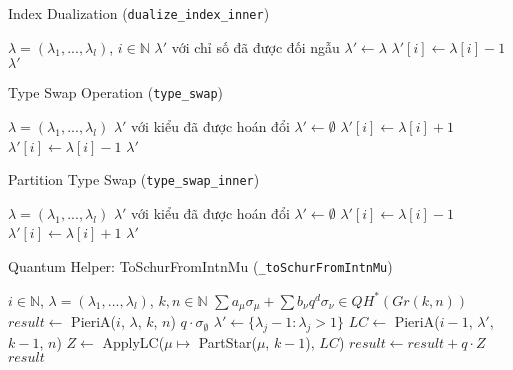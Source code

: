 \begin{algorithm}[H]
\caption{Index Dualization (\texttt{dualize\_index\_inner})}
\begin{algorithmic}[1]
\REQUIRE $\lambda = (\lambda_1, ..., \lambda_l)$, $i \in \mathbb{N}$
\ENSURE $\lambda'$ với chỉ số đã được đối ngẫu
\STATE $\lambda' \gets \lambda$
\STATE $\lambda'[i] \gets \lambda[i] - 1$
\RETURN $\lambda'$
\end{algorithmic}
\end{algorithm}

\begin{algorithm}[H]
\caption{Type Swap Operation (\texttt{type\_swap})}
\begin{algorithmic}[1]
\REQUIRE $\lambda = (\lambda_1, ..., \lambda_l)$
\ENSURE $\lambda'$ với kiểu đã được hoán đổi
\STATE $\lambda' \gets \emptyset$
        \STATE $\lambda'[i] \gets \lambda[i] + 1$
    \ELSE
        \STATE $\lambda'[i] \gets \lambda[i] - 1$
    \ENDIF
\ENDFOR
\RETURN $\lambda'$
\end{algorithmic}
\end{algorithm}

\begin{algorithm}[H]
\caption{Partition Type Swap (\texttt{type\_swap\_inner})}
\begin{algorithmic}[1]
\REQUIRE $\lambda = (\lambda_1, ..., \lambda_l)$
\ENSURE $\lambda'$ với kiểu đã được hoán đổi
\STATE $\lambda' \gets \emptyset$
        \STATE $\lambda'[i] \gets \lambda[i] - 1$
    \ELSE
        \STATE $\lambda'[i] \gets \lambda[i] + 1$
    \ENDIF
\ENDFOR
\RETURN $\lambda'$
\end{algorithmic}
\end{algorithm}

\begin{algorithm}[H]
\caption{Quantum Helper: ToSchurFromIntnMu (\texttt{\_toSchurFromIntnMu})}
\begin{algorithmic}[1]
\REQUIRE $i \in \mathbb{N}$, $\lambda = (\lambda_1, ..., \lambda_l)$, $k, n \in \mathbb{N}$
\ENSURE $\sum a_\mu \sigma_\mu + \sum b_\nu q^d \sigma_\nu \in QH^*(Gr(k,n))$
\STATE $result \gets$ PieriA($i$, $\lambda$, $k$, $n$)
        \RETURN $q \cdot \sigma_{\emptyset}$
    \ENDIF
    \STATE $\lambda' \gets \{\lambda_j - 1 : \lambda_j > 1\}$
    \STATE $LC \gets$ PieriA($i-1$, $\lambda'$, $k-1$, $n$)
    \STATE $Z \gets$ ApplyLC($\mu \mapsto$ PartStar($\mu$, $k-1$), $LC$)
    \STATE $result \gets result + q \cdot Z$
\ENDIF
\RETURN $result$
\end{algorithmic}
\end{algorithm}

